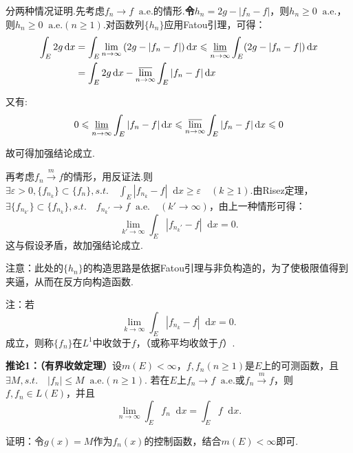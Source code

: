\documentclass[bwprint, withoutpreface]{cumcmthesis}
\newcommand*{\dif}{\mathop{}\!\mathrm{d}}
\begin{document}
分两种情况证明.先考虑$f_n \to f \mathop{} \! \mathrm{a.e.}$的情形.\textbf{令$h_n = 2g - |f_n - f|$}，则$h_n \geqslant 0 \mathop{} \! \mathrm{a.e.}$，则$h_n \geqslant 0 \mathop{} \! \mathrm{a.e.} (n \geqslant 1)$.对函数列$\{h_n\}$应用Fatou引理，可得：
\begin{align*}
	\int_E 2g \dif x & = \int_E \lim_{n \to \infty}{(2g - |f_n - f|) \dif x}  \leqslant \varliminf_{n \to \infty}{\int_E (2g - |f_n - f|) \dif x} \\
				     & = \int_E 2g \dif x - \varlimsup_{n \to \infty}{\int_E |f_n - f| \dif x}
\end{align*}

又有:
\begin{equation*}
	0 \leqslant \varliminf_{n \to \infty}{\int_E |f_n - f| \dif x} \leqslant \varlimsup_{n \to \infty}{\int_E |f_n - f| \dif x} \leqslant 0
\end{equation*}

故可得加强结论成立.

再考虑$f_n \stackrel{m}{\longrightarrow} f$的情形，用反证法.则$\exists \varepsilon > 0, \{f_{n_k}\} \subset \{f_n\}, s.t. \quad \int_E |f_{n_k} - f| \dif x \geqslant \varepsilon \quad (k \geqslant 1).$由Risez定理，$\exists \{f_{n_{k'}}\} \subset \{f_{n_k}\}, s.t. \quad f_{n_k'} \to f \mathop{} \! \mathrm{a.e.} \quad (k' \to \infty)$，由上一种情形可得：
\begin{equation*}
	\lim_{k' \to \infty}{\int_E |f_{n_k'} - f| \dif x} = 0.
\end{equation*}
这与假设矛盾，故加强结论成立.

注意：此处的$\{h_n\}$的构造思路是依据Fatou引理与非负构造的，为了使极限值得到夹逼，从而在反方向构造函数.

注：若
\begin{equation*}
	\lim_{k \to \infty}{\int_E |f_{n_k} - f| \dif x} = 0.
\end{equation*}
成立，则称$\{f_n\}$在$L^1$中收敛于$f$，（或称平均收敛于$f$）.

\textbf{推论1：（有界收敛定理）}设$m(E) < \infty$，$f, f_n(n \geqslant 1)$是$E$上的可测函数，且$\exists M, s.t. \quad |f_n| \leqslant M \mathop{} \! \mathrm{a.e.} (n \geqslant 1)$. 若在$E$上$f_n \to f \mathop{} \! \mathrm{a.e.}$或$f_n \stackrel{m}{\longrightarrow} f$，则$f, f_n \in L(E)$，并且
\begin{equation*}
	\lim_{n \to \infty} \int_E f_n \dif x = \int_E f \dif x.
\end{equation*}

证明：令$g(x) = M$作为$f_n(x)$的控制函数，结合$m(E) < \infty$即可.
\end{document}
